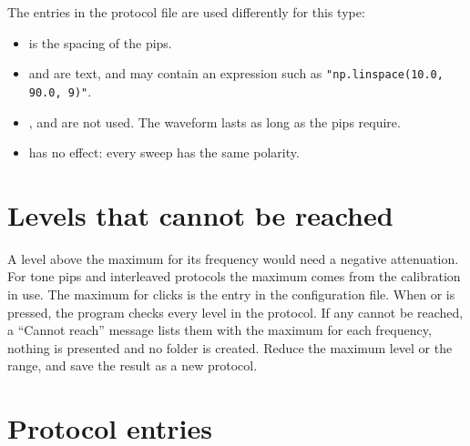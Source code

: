 The entries in the protocol file are used differently for this type:

\begin{itemize}
  \item {} is the spacing of the pips.
  \item {} and  are text, and may contain an expression such as
        \texttt{"np.linspace(10.0, 90.0, 9)"}.
  \item {},  and  are not used. The waveform
        lasts as long as the pips require.
  \item {} has no effect: every sweep has the same polarity.
\end{itemize}

\section{Levels that cannot be reached}
\label{sec:level-check}

A level above the maximum for its frequency would need a negative attenuation. For
tone pips and interleaved protocols the maximum comes from the calibration in use. The
maximum for clicks is the entry  in the configuration
file. When  or
 is pressed, the program checks every level in the protocol. If
any cannot be reached, a ``Cannot reach'' message lists them with the maximum for each
frequency, nothing is presented and no folder is created. Reduce the maximum level or
the range, and save the result as a new protocol.

\section{Protocol entries}
\label{sec:protocol-entries}

